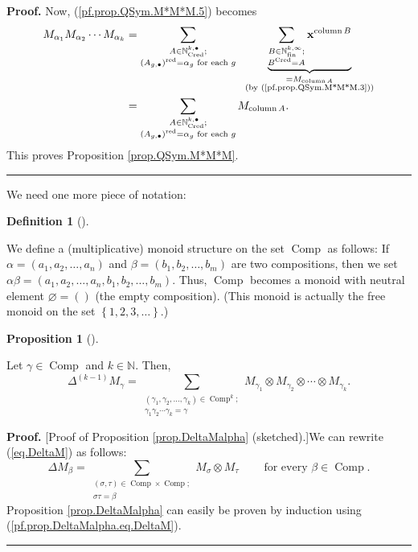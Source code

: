 \documentclass
[numbers=enddot,12pt,final,onecolumn,notitlepage,abstracton]{scrartcl}%
\theoremstyle{definition}
\newtheorem{prop}[theo]{Proposition}
\newenvironment{proposition}[1][]
{\begin{prop}[#1]\begin{leftbar}}
{\end{leftbar}\end{prop}}
\newtheorem{defi}[theo]{Definition}
\newenvironment{definition}[1][]
{\begin{defi}[#1]\begin{leftbar}}
{\end{leftbar}\end{defi}}
\newenvironment{proof}[1][Proof]{\noindent\textbf{#1.} }{\ \rule{0.5em}{0.5em}}
\let\sumnonlimits\sum
\renewcommand{\sum}{\sumnonlimits\limits}
\begin{document}
\begin{proof}
Now, (\ref{pf.prop.QSym.M*M*M.5}) becomes%
\begin{align*}
M_{\alpha_{1}}M_{\alpha_{2}}\cdots M_{\alpha_{k}}  &  =\sum_{\substack{A\in
\mathbb{N}_{\operatorname*{Cred}}^{k,\bullet};\\\left(  A_{g,\bullet}\right)
^{\operatorname*{red}}=\alpha_{g}\text{ for each }g}}\ \ \underbrace{\sum
_{\substack{B\in\mathbb{N}_{\operatorname*{fin}}^{k,\infty}%
;\\B^{\operatorname*{Cred}}=A}}\mathbf{x}^{\operatorname*{column}B}%
}_{\substack{=M_{\operatorname*{column}A}\\\text{(by
(\ref{pf.prop.QSym.M*M*M.3}))}}}\\
&  =\sum_{\substack{A\in\mathbb{N}_{\operatorname*{Cred}}^{k,\bullet
};\\\left(  A_{g,\bullet}\right)  ^{\operatorname*{red}}=\alpha_{g}\text{ for
each }g}}M_{\operatorname*{column}A}.
\end{align*}
This proves Proposition \ref{prop.QSym.M*M*M}.
\end{proof}

We need one more piece of notation:

\begin{definition}
\label{def.Comp.monoid}We define a (multiplicative) monoid structure on the
set $\operatorname*{Comp}$ as follows: If $\alpha=\left(  a_{1},a_{2}%
,\ldots,a_{n}\right)  $ and $\beta=\left(  b_{1},b_{2},\ldots,b_{m}\right)  $
are two compositions, then we set $\alpha\beta=\left(  a_{1},a_{2}%
,\ldots,a_{n},b_{1},b_{2},\ldots,b_{m}\right)  $. Thus, $\operatorname*{Comp}$
becomes a monoid with neutral element $\varnothing=\left(  {}\right)  $ (the
empty composition). (This monoid is actually the free monoid on the set
$\left\{  1,2,3,\ldots\right\}  $.)
\end{definition}

\begin{proposition}
\label{prop.DeltaMalpha}Let $\gamma\in\operatorname*{Comp}$ and $k\in
\mathbb{N}$. Then,%
\[
\Delta^{\left(  k-1\right)  }M_{\gamma}=\sum_{\substack{\left(  \gamma
_{1},\gamma_{2},\ldots,\gamma_{k}\right)  \in\operatorname*{Comp}%
\nolimits^{k};\\\gamma_{1}\gamma_{2}\cdots\gamma_{k}=\gamma}}M_{\gamma_{1}%
}\otimes M_{\gamma_{2}}\otimes\cdots\otimes M_{\gamma_{k}}.
\]

\end{proposition}

\begin{proof}
[Proof of Proposition \ref{prop.DeltaMalpha} (sketched).]We can rewrite
(\ref{eq.DeltaM}) as follows:%
\begin{equation}
\Delta M_{\beta}=\sum_{\substack{\left(  \sigma,\tau\right)  \in
\operatorname*{Comp}\times\operatorname*{Comp};\\\sigma\tau=\beta}}M_{\sigma
}\otimes M_{\tau}\ \ \ \ \ \ \ \ \ \ \text{for every }\beta\in
\operatorname*{Comp}. \label{pf.prop.DeltaMalpha.eq.DeltaM}%
\end{equation}
Proposition \ref{prop.DeltaMalpha} can easily be proven by induction using
(\ref{pf.prop.DeltaMalpha.eq.DeltaM}).
\end{proof}
\end{document}
